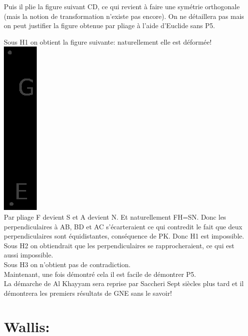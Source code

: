 \documentclass[a4paper, 12pt, twoside]{book}
\begin{document}
  Puis il plie la figure suivant CD, ce qui revient à faire une symétrie orthogonale (mais la notion de transformation n'existe pas encore). On ne détaillera pas mais on peut justifier la figure obtenue par pliage à l'aide d'Euclide sans P5. 
  
  
  Sous H1 on obtient la figure suivante: naturellement elle est déformée!\\
  
  
  
   \includegraphics[scale=0.7]{figures/KHAYYAM2.eps}\\
   
   
   Par pliage F devient S et A devient N. Et naturellement FH=SN. Donc  les perpendiculaires à AB, BD et AC s'écarteraient ce qui contredit le fait que deux perpendiculaires sont équidistantes, conséquence de PK. Donc H1 est impossible.\\
   
   Sous H2 on obtiendrait que les perpendiculaires se rapprocheraient, ce qui est aussi impossible.\\
   
   Sous H3 on n'obtient pas de contradiction.\\
   
   
  Maintenant, une fois démontré cela il est facile de démontrer P5.\\
  
  La démarche de Al Khayyam sera reprise par Saccheri Sept siècles plus tard et il démontrera les premiers résultats de GNE sans le savoir!
   
 
\newpage
 \chapter{Wallis:}
 
\end{document}
